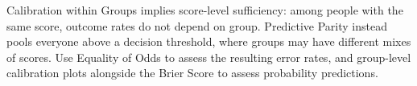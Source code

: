 \metricsecondary

Calibration within Groups implies score-level sufficiency: among people with the same score, outcome rates do not depend on group. Predictive Parity instead pools everyone above a decision threshold, where groups may have different mixes of scores. Use Equality of Odds to assess the resulting error rates, and group-level calibration plots alongside the Brier Score to assess probability predictions.
\metricend
